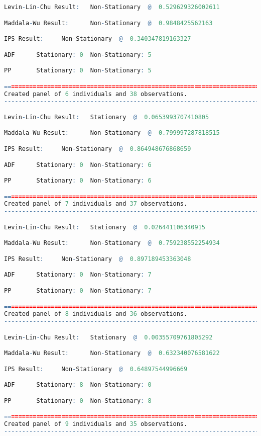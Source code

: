 \begin{lstlisting}[language=R]
Levin-Lin-Chu Result:   Non-Stationary  @  0.529629326002611

Maddala-Wu Result:      Non-Stationary  @  0.9848425562163

IPS Result:     Non-Stationary  @  0.340347819163327

ADF      Stationary: 0  Non-Stationary: 5

PP       Stationary: 0  Non-Stationary: 5

=========================================================================
Created panel of 6 individuals and 38 observations.
-------------------------------------------------------------------------

Levin-Lin-Chu Result:   Stationary  @  0.0653993707410805

Maddala-Wu Result:      Non-Stationary  @  0.799997287818515

IPS Result:     Non-Stationary  @  0.864948676868659

ADF      Stationary: 0  Non-Stationary: 6

PP       Stationary: 0  Non-Stationary: 6

=========================================================================
Created panel of 7 individuals and 37 observations.
-------------------------------------------------------------------------

Levin-Lin-Chu Result:   Stationary  @  0.026441106340915

Maddala-Wu Result:      Non-Stationary  @  0.759238552254934

IPS Result:     Non-Stationary  @  0.897189453363048

ADF      Stationary: 0  Non-Stationary: 7

PP       Stationary: 0  Non-Stationary: 7

=========================================================================
Created panel of 8 individuals and 36 observations.
-------------------------------------------------------------------------

Levin-Lin-Chu Result:   Stationary  @  0.00355709761805292

Maddala-Wu Result:      Non-Stationary  @  0.632340076581622

IPS Result:     Non-Stationary  @  0.64897544996669

ADF      Stationary: 8  Non-Stationary: 0

PP       Stationary: 0  Non-Stationary: 8

=========================================================================
Created panel of 9 individuals and 35 observations.
-------------------------------------------------------------------------


\end{lstlisting}

